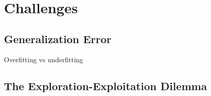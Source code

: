 \section{Challenges}

\subsection{Generalization Error}
Overfitting vs underfitting

\subsection{The Exploration-Exploitation Dilemma}